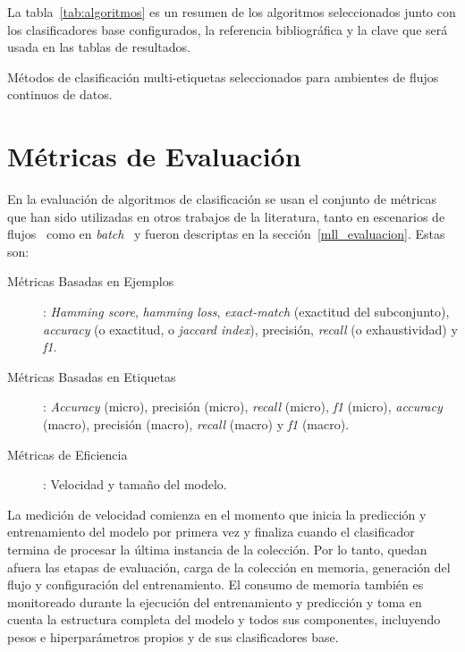 La tabla~\ref{tab:algoritmos} es un resumen de los algoritmos seleccionados
junto con los clasificadores base configurados, la referencia bibliográfica y la
clave que será usada en las tablas de resultados.

\begin{table}[htbp]
	\centering
	\begin{adjustbox}{max width=\textwidth}
		
	\end{adjustbox}
	\caption{Métodos de clasificación multi-etiquetas seleccionados para ambientes
		de flujos continuos de datos.}
	\label{tab:algoritmos}
\end{table}

\section{Métricas de Evaluación}

En la evaluación de algoritmos de clasificación se usan el conjunto de métricas
que han sido utilizadas en otros trabajos de la literatura, tanto en escenarios
de
flujos~\cite{sousa_multi-label_2018,zheng_survey_2020,osojnik_multi-label_2017}
como en
\textit{batch}~\cite{madjarov_extensive_2012,zhang_multi-label_2010,gibaja_tutorial_2015}
y fueron descriptas en la sección~\ref{mll_evaluacion}.  Estas son:

\begin{description}

	\item[Métricas Basadas en Ejemplos]: \textit{Hamming score}, \textit{hamming
		      loss}, \textit{exact-match} (exactitud del subconjunto),
	      \textit{accuracy} (o exactitud, o \textit{jaccard index}), precisión,
	      \textit{recall} (o exhaustividad) y \textit{f1}.

	\item[Métricas Basadas en Etiquetas]: \textit{Accuracy} (micro), precisión
	      (micro), \textit{recall} (micro), \textit{f1} (micro),
	      \textit{accuracy} (macro), precisión (macro), \textit{recall} (macro)
	      y \textit{f1} (macro).

	\item[Métricas de Eficiencia]: Velocidad y tamaño del modelo.

\end{description}

La medición de velocidad comienza en el momento que inicia la predicción y
entrenamiento del modelo por primera vez y finaliza cuando el clasificador
termina de procesar la última instancia de la colección. Por lo tanto, quedan
afuera las etapas de evaluación, carga de la colección en memoria, generación
del flujo y configuración del entrenamiento. El consumo de memoria también es
monitoreado durante la ejecución del entrenamiento y predicción y toma en cuenta
la estructura completa del modelo y todos sus componentes, incluyendo pesos e
hiperparámetros propios y de sus clasificadores base.

